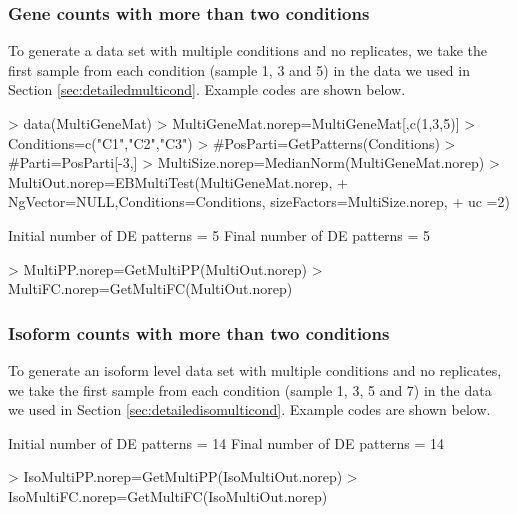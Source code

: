 \documentclass{article}
\begin{document}
\subsubsection{Gene counts with more than two conditions}
\label{norepisode}
To generate a data set with multiple conditions and no replicates, 
we take the first sample from each condition (sample 1, 3 and 5) in the data we used
in Section \ref{sec:detailedmulticond}. 
Example codes are shown below.
\begin{Schunk}
\begin{Sinput}
> data(MultiGeneMat)
> MultiGeneMat.norep=MultiGeneMat[,c(1,3,5)]
> Conditions=c("C1","C2","C3")
> #PosParti=GetPatterns(Conditions)
> #Parti=PosParti[-3,]
> MultiSize.norep=MedianNorm(MultiGeneMat.norep)
> MultiOut.norep=EBMultiTest(MultiGeneMat.norep,
+ NgVector=NULL,Conditions=Conditions, sizeFactors=MultiSize.norep, 
+ uc =2)
\end{Sinput}
\begin{Soutput}
Initial number of DE patterns = 5
Final number of DE patterns = 5
\end{Soutput}
\begin{Sinput}
> MultiPP.norep=GetMultiPP(MultiOut.norep)
> MultiFC.norep=GetMultiFC(MultiOut.norep)
\end{Sinput}
\end{Schunk}

\subsubsection{Isoform counts with more than two conditions}
\label{sec:norepmulticond}
To generate an isoform level data set with multiple conditions and no replicates,
we take the first sample from each condition (sample 1, 3, 5 and 7) in the data we used
in Section \ref{sec:detailedisomulticond}. 
Example codes are shown below.



\begin{Schunk}
\begin{Soutput}
Initial number of DE patterns = 14
Final number of DE patterns = 14
\end{Soutput}
\begin{Sinput}
> IsoMultiPP.norep=GetMultiPP(IsoMultiOut.norep)
> IsoMultiFC.norep=GetMultiFC(IsoMultiOut.norep)
\end{Sinput}
\end{Schunk}
\end{document}

